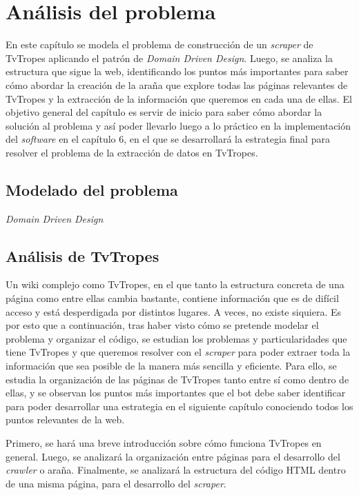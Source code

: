 \chapter{Análisis del problema}
En este capítulo se modela el problema de construcción de un \textit{scraper} de
TvTropes aplicando el patrón de \textit{Domain Driven Design}. Luego, se analiza
la estructura que sigue la web, identificando los puntos más importantes para
saber cómo abordar la creación de la araña que explore todas las páginas
relevantes de TvTropes y la extracción de la información que queremos en cada
una de ellas. El objetivo general del capítulo es servir de inicio para saber
cómo abordar la solución al problema y así poder llevarlo luego a lo práctico en
la implementación del \textit{software} en el capítulo 6, en el que se
desarrollará la estrategia final para resolver el problema de la extracción de
datos en TvTropes.

\section{Modelado del problema}

\textit{Domain Driven Design}

\section{Análisis de TvTropes}
Un wiki complejo como TvTropes, en el que tanto la estructura concreta de una
página como entre ellas cambia bastante, contiene información que es de difícil
acceso y está desperdigada por distintos lugares. A veces, no existe siquiera.
Es por esto que a continuación, tras haber visto cómo se pretende modelar el
problema y organizar el código, se estudian los problemas y particularidades que
tiene TvTropes y que queremos resolver con el \textit{scraper} para poder
extraer toda la información que sea posible de la manera más sencilla y
eficiente. Para ello, se estudia la organización de las páginas de TvTropes
tanto entre sí como dentro de ellas, y se observan los puntos más importantes
que el bot debe saber identificar para poder desarrollar una estrategia en el
siguiente capítulo conociendo todos los puntos relevantes de la web.

Primero, se hará una breve introducción sobre cómo funciona TvTropes en general.
Luego, se analizará la organización entre páginas para el desarrollo del
\textit{crawler} o araña. Finalmente, se analizará la estructura del código HTML
dentro de una misma página, para el desarrollo del \textit{scraper}.

